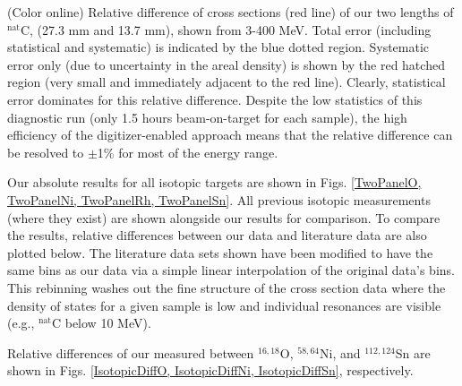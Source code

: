 (Color online) Relative difference of cross sections (red line) of
        our two lengths of $^{\text{nat}}$C, (27.3 mm and 13.7 mm), shown from 3-400
        MeV. Total error
        (including statistical and systematic) is indicated by the blue
        dotted region. Systematic error only (due to uncertainty in the areal
        density) is shown by the red hatched region (very small and immediately adjacent to 
        the red line). Clearly, statistical error dominates for this relative
        difference.
        Despite the low statistics of this diagnostic run (only 1.5 hours
        beam-on-target for each sample), the high efficiency of the
        digitizer-enabled approach means that the relative difference can be resolved to 
        $\pm$1\% for most of the energy range.


Our absolute \totEs results for all isotopic targets are shown in Figs.
\ref{TwoPanelO, TwoPanelNi, TwoPanelRh, TwoPanelSn}. All previous isotopic \totEs
measurements (where they exist) are shown alongside our results for comparison.
To compare the results, relative differences between our data and literature
data are also plotted below. The literature
data sets shown have been modified to have the same bins as our data via a simple
linear interpolation of the original data's bins. This rebinning
washes out the fine structure of the cross section data where the density of states
for a given sample is low and individual resonances are visible
(e.g., $^{\text{nat}}$C below 10 MeV).

Relative differences of our measured \totEs between $^{16,18}$O, $^{58,64}$Ni, and
$^{112,124}$Sn are shown in Figs. \ref{IsotopicDiffO, IsotopicDiffNi, 
IsotopicDiffSn}, respectively. 

